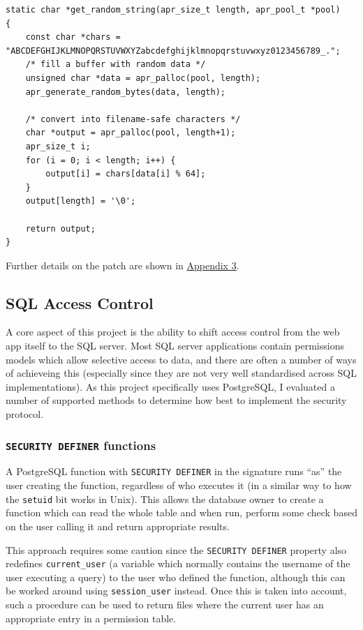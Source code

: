 \documentclass{article}
\begin{document}
\begin{verbatim}
static char *get_random_string(apr_size_t length, apr_pool_t *pool)
{
    const char *chars = "ABCDEFGHIJKLMNOPQRSTUVWXYZabcdefghijklmnopqrstuvwxyz0123456789_.";
    /* fill a buffer with random data */
    unsigned char *data = apr_palloc(pool, length);
    apr_generate_random_bytes(data, length);

    /* convert into filename-safe characters */
    char *output = apr_palloc(pool, length+1);
    apr_size_t i;
    for (i = 0; i < length; i++) {
        output[i] = chars[data[i] % 64];
    }
    output[length] = '\0';

    return output;
}
\end{verbatim}

Further details on the patch are shown in \hyperref[sec:appendix3]{Appendix 3}.


\subsection{SQL Access Control}
A core aspect of this project is the ability to shift access control from the web app itself to the SQL server. Most SQL server applications contain permissions models which allow selective access to data, and there are often a number of ways of achieveing this (especially since they are not very well standardised across SQL implementations). As this project specifically uses PostgreSQL, I evaluated a number of supported methods to determine how best to implement the security protocol.

\subsubsection{\texttt{SECURITY DEFINER} functions}
A PostgreSQL function with \texttt{SECURITY DEFINER} in the signature runs ``as'' the user creating the function, regardless of who executes it\cite{postgres-SEC_DEF} (in a similar way to how the \texttt{setuid} bit works in Unix). This allows the database owner to create a function which can read the whole table and when run, perform some check based on the user calling it and return appropriate results.

This approach requires some caution since the \texttt{SECURITY DEFINER} property also redefines \verb+current_user+ (a variable which normally contains the username of the user executing a query) to the user who defined the function, although this can be worked around using \verb+session_user+ instead. Once this is taken into account, such a procedure can be used to return files where the current user has an appropriate entry in a permission table.
\end{document}
